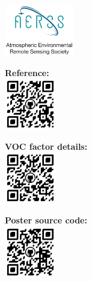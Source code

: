 \documentclass[final]{beamer}
\newlength{\sepwidth}
\newlength{\colwidth}
\newcommand{\separatorcolumn}{\begin{column}{\sepwidth}\end{column}}
\begin{document}
\begin{frame}[t]
\begin{columns}[t]
\begin{column}{\colwidth}
			\begin{block}{}
			    \begin{figure}
                   \begin{minipage}[c]{0.24\colwidth}
                       \includegraphics[height=6em]{logos/aerss_logo.png}
                   \end{minipage}
                   \begin{minipage}[c]{0.24\colwidth}
                       \textbf{Reference: }\\
                       \includegraphics[height=6em]{logos/Reference.png}
                   \end{minipage}
                   \begin{minipage}[c]{0.24\colwidth}
                       \textbf{VOC factor details: }\\
                       \includegraphics[height=6em]{logos/vocfactor_detail.png}
                   \end{minipage}
                   \begin{minipage}[c]{0.24\colwidth}
                       \textbf{Poster source code:}\\
                       \includegraphics[height=6em]{logos/source_code.png}
                   \end{minipage}
                \end{figure}

			\end{block}
			
		\end{column}
		
		\separatorcolumn
	\end{columns}
\end{frame}
\end{document}
